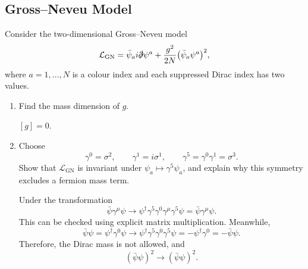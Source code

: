 \subsection{Gross--Neveu Model}

Consider the two-dimensional Gross--Neveu model
\begin{equation}
    \mathcal{L}_{\mathrm{GN}}
    =\bar\psi_a i\slashed{\partial}\psi^a
    +\frac{g^2}{2N}\bigl(\bar\psi_a\psi^a\bigr)^2,
\end{equation}
where $a=1,\ldots,N$ is a colour index and each suppressed Dirac index has
two values.

\begin{enumerate}[label=\alph*)]
    \item Find the mass dimension of $g$.
    \begin{solution}
        $[g] =0$.
    \end{solution}

    \item Choose
    \begin{equation}
        \gamma^0=\sigma^2,
        \qquad
        \gamma^1=i\sigma^1,
        \qquad
        \gamma^5=\gamma^0\gamma^1=\sigma^3.
    \end{equation}
    Show that $\mathcal{L}_{\mathrm{GN}}$ is invariant under
    $\psi_a\mapsto\gamma^5\psi_a$, and explain why this symmetry excludes a
    fermion mass term.
    \begin{solution}
        Under the transformation
        \begin{equation}
            \bar \psi \gamma^\mu \psi \to \psi^\dagger \gamma^5\gamma^0 \gamma^\mu \gamma^5 \psi = \bar \psi\gamma^\mu\psi.
        \end{equation}
        This can be checked using explicit matrix multiplication. Meanwhile,
        \begin{equation}
            \bar \psi \psi = \psi^\dagger \gamma^0 \psi \to \psi^\dagger \gamma^5 \gamma^0 \gamma^5 \psi = - \psi^\dagger \gamma^0 = -\bar \psi \psi.
        \end{equation}
        Therefore, the Dirac mass is not allowed, and
        \begin{equation}
            (\bar \psi \psi)^2 \to (\bar \psi \psi)^2.
        \end{equation}
    \end{solution}


\end{enumerate}
